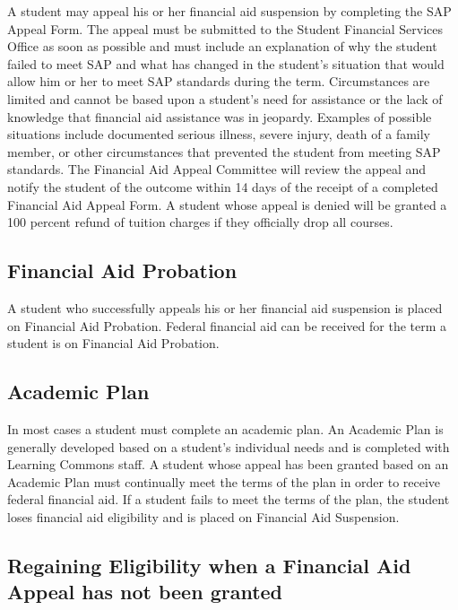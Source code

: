 \documentclass[
  letterpaper,
]{scrbook}
\begin{document}
A student may appeal his or her financial aid suspension by completing
the SAP Appeal Form. The appeal must be submitted to the Student
Financial Services Office as soon as possible and must include an
explanation of why the student failed to meet SAP and what has changed
in the student's situation that would allow him or her to meet SAP
standards during the term. Circumstances are limited and cannot be based
upon a student's need for assistance or the lack of knowledge that
financial aid assistance was in jeopardy. Examples of possible
situations include documented serious illness, severe injury, death of a
family member, or other circumstances that prevented the student from
meeting SAP standards. The Financial Aid Appeal Committee will review
the appeal and notify the student of the outcome within 14 days of the
receipt of a completed Financial Aid Appeal Form. A student whose appeal
is denied will be granted a 100 percent refund of tuition charges if
they officially drop all courses.

\subsection{\texorpdfstring{\textbf{Financial Aid
Probation}}{Financial Aid Probation}}\label{financial-aid-probation}

A student who successfully appeals his or her financial aid suspension
is placed on Financial Aid Probation. Federal financial aid can be
received for the term a student is on Financial Aid Probation.

\subsection{\texorpdfstring{\textbf{Academic
Plan}}{Academic Plan}}\label{academic-plan}

In most cases a student must complete an academic plan. An Academic Plan
is generally developed based on a student's individual needs and is
completed with Learning Commons staff. A student whose appeal has been
granted based on an Academic Plan must continually meet the terms of the
plan in order to receive federal financial aid. If a student fails to
meet the terms of the plan, the student loses financial aid eligibility
and is placed on Financial Aid Suspension.

\subsection{\texorpdfstring{\textbf{Regaining Eligibility when a
Financial Aid Appeal has not been
granted}}{Regaining Eligibility when a Financial Aid Appeal has not been granted}}\label{regaining-eligibility-when-a-financial-aid-appeal-has-not-been-granted}
\end{document}
